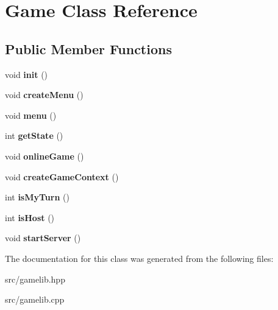 \hypertarget{class_game}{}\section{Game Class Reference}
\label{class_game}
\subsection*{Public Member Functions}
\begin{DoxyCompactItemize}
\item 
void {\bfseries init} ()\hypertarget{class_game_a6f3a33940524b6ba9d83f627ccb14bbf}{}\label{class_game_a6f3a33940524b6ba9d83f627ccb14bbf}

\item 
void {\bfseries create\+Menu} ()\hypertarget{class_game_a3bce2a9f8f79bd9ce6878a1afd51994d}{}\label{class_game_a3bce2a9f8f79bd9ce6878a1afd51994d}

\item 
void {\bfseries menu} ()\hypertarget{class_game_a463932fa7ca2f1ce243279bf2422fc48}{}\label{class_game_a463932fa7ca2f1ce243279bf2422fc48}

\item 
int {\bfseries get\+State} ()\hypertarget{class_game_a80324d4742c70ca5b52171382cfb2327}{}\label{class_game_a80324d4742c70ca5b52171382cfb2327}

\item 
void {\bfseries online\+Game} ()\hypertarget{class_game_adc94b469c429df61f845891b45805061}{}\label{class_game_adc94b469c429df61f845891b45805061}

\item 
void {\bfseries create\+Game\+Context} ()\hypertarget{class_game_a4e497a8b5bf1e585a66324f4884f055b}{}\label{class_game_a4e497a8b5bf1e585a66324f4884f055b}

\item 
int {\bfseries is\+My\+Turn} ()\hypertarget{class_game_ac978133ca5e0a54ab72f8c1da13e9fbd}{}\label{class_game_ac978133ca5e0a54ab72f8c1da13e9fbd}

\item 
int {\bfseries is\+Host} ()\hypertarget{class_game_a6e10e827638cabd577ce12ab68497d31}{}\label{class_game_a6e10e827638cabd577ce12ab68497d31}

\item 
void {\bfseries start\+Server} ()\hypertarget{class_game_aed51d3d3760d9c052cdf33144ead0fba}{}\label{class_game_aed51d3d3760d9c052cdf33144ead0fba}

\end{DoxyCompactItemize}


The documentation for this class was generated from the following files\+:\begin{DoxyCompactItemize}
\item 
src/gamelib.\+hpp\item 
src/gamelib.\+cpp\end{DoxyCompactItemize}
